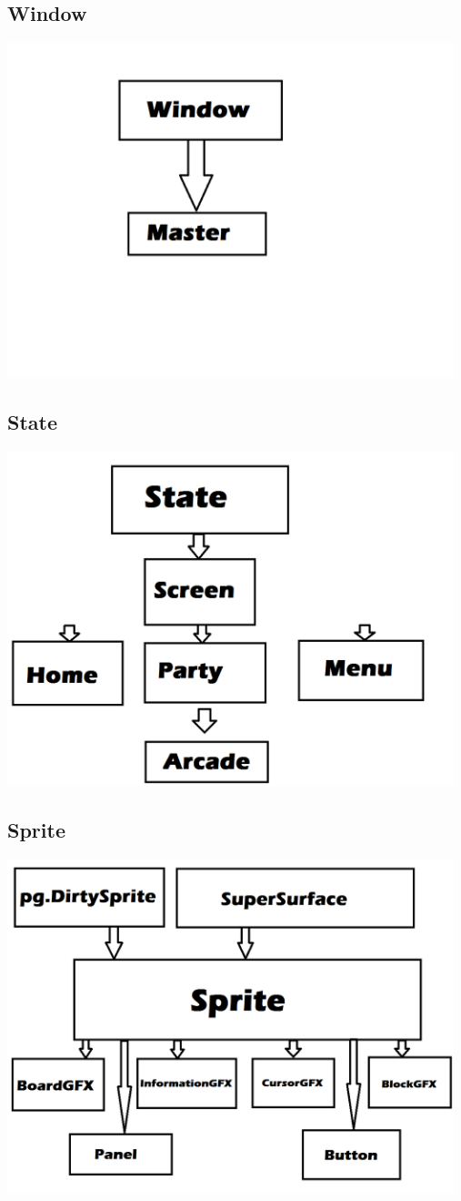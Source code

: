 \documentclass[]{article}
\begin{document}
\subsection*{Window}
\includegraphics[width=13cm]{Window}
\subsection*{State}
\includegraphics[width=13cm]{State}
\subsection*{Sprite}
\includegraphics[width=13cm]{Sprite}
\end{document}
